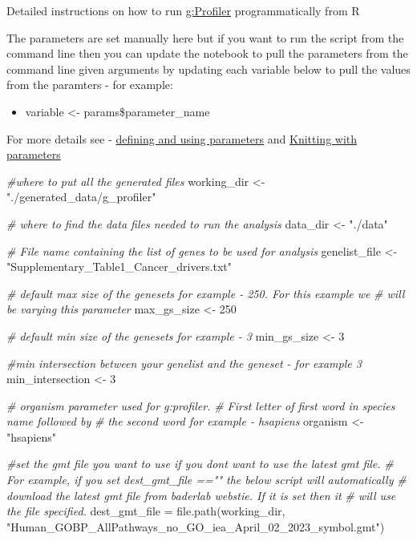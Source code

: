 \documentclass[
]{book}
\newenvironment{Shaded}{\begin{snugshade}}{\end{snugshade}}
\newcommand{\CommentTok}[1]{\textcolor[rgb]{0.56,0.35,0.01}{\textit{#1}}}
\newcommand{\DecValTok}[1]{\textcolor[rgb]{0.00,0.00,0.81}{#1}}
\newcommand{\FunctionTok}[1]{\textcolor[rgb]{0.00,0.00,0.00}{#1}}
\newcommand{\NormalTok}[1]{#1}
\newcommand{\OtherTok}[1]{\textcolor[rgb]{0.56,0.35,0.01}{#1}}
\newcommand{\StringTok}[1]{\textcolor[rgb]{0.31,0.60,0.02}{#1}}
\providecommand{\tightlist}{%
  \setlength{\itemsep}{0pt}\setlength{\parskip}{0pt}}
\begin{document}
Detailed instructions on how to run \href{https://biit.cs.ut.ee/gprofiler/gost}{g:Profiler} programmatically from R

The parameters are set manually here but if you want to run the script from the command line then you can update the notebook to pull the parameters from the command line given arguments by updating each variable below to pull the values from the paramters - for example:

\begin{itemize}
\tightlist
\item
  variable \textless- params\$parameter\_name
\end{itemize}

For more details see - \href{https://bookdown.org/yihui/rmarkdown/params-declare.html}{defining and using parameters} and \href{https://bookdown.org/yihui/rmarkdown/params-knit.html}{Knitting with parameters}

\begin{Shaded}
\begin{Highlighting}[]
\CommentTok{\#where to put all the generated files}
\NormalTok{working\_dir }\OtherTok{\textless{}{-}} \StringTok{"./generated\_data/g\_profiler"}

\CommentTok{\# where to find the data files needed to run the analysis}
\NormalTok{data\_dir }\OtherTok{\textless{}{-}}  \StringTok{"./data"}

\CommentTok{\# File name containing the list of genes to be used for analysis}
\NormalTok{genelist\_file }\OtherTok{\textless{}{-}} \StringTok{"Supplementary\_Table1\_Cancer\_drivers.txt"}

\CommentTok{\# default max size of the genesets for example {-}  250.  For this example we}
\CommentTok{\# will be varying this parameter}
\NormalTok{max\_gs\_size }\OtherTok{\textless{}{-}} \DecValTok{250}

\CommentTok{\# default min size of the genesets for example {-}  3}
\NormalTok{min\_gs\_size }\OtherTok{\textless{}{-}} \DecValTok{3}

\CommentTok{\#min intersection between your genelist and the geneset {-} for example 3}
\NormalTok{min\_intersection }\OtherTok{\textless{}{-}} \DecValTok{3}

\CommentTok{\# organism parameter used for g:profiler.  }
\CommentTok{\# First letter of first word in species name followed by }
\CommentTok{\# the second word for example {-} hsapiens}
\NormalTok{organism }\OtherTok{\textless{}{-}} \StringTok{"hsapiens"}

\CommentTok{\#set the gmt file you want to use if you don\textquotesingle{}t want to use the latest gmt file.}
\CommentTok{\# For example, if you set dest\_gmt\_file =="" the below script will automatically}
\CommentTok{\# download the latest gmt file from baderlab webstie.  If it is set then it}
\CommentTok{\# will use the file specified.  }
\NormalTok{dest\_gmt\_file }\OtherTok{=} \FunctionTok{file.path}\NormalTok{(working\_dir, }
                  \StringTok{"Human\_GOBP\_AllPathways\_no\_GO\_iea\_April\_02\_2023\_symbol.gmt"}\NormalTok{)}
\end{Highlighting}
\end{Shaded}
\end{document}
